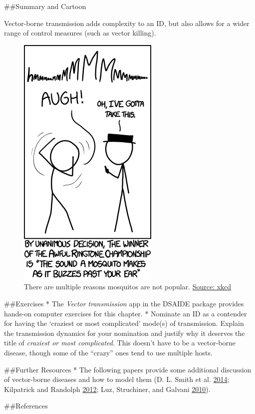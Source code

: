 \documentclass[]{book}
\theoremstyle{definition}
\theoremstyle{definition}
\theoremstyle{definition}
\theoremstyle{remark}
\begin{document}
\#\#Summary and Cartoon

Vector-borne transmission adds complexity to an ID, but also allows for
a wider range of control measures (such as vector killing).

\begin{figure}
\centering
\includegraphics{./images/xkcd-mosquito-ringtone.png}
\caption{There are multiple reasons mosquitos are not popular.
\href{https://xkcd.com/1241/}{Source: xkcd}}
\end{figure}

\#\#Exercises * The \emph{Vector transmission} app in the DSAIDE package
provides hands-on computer exercises for this chapter. * Nominate an ID
as a contender for having the `craziest or most complicated' mode(s) of
transmission. Explain the transmission dynamics for your nomination and
justify why it deserves the title of \emph{craziest or most
complicated}. This doesn't have to be a vector-borne disease, though
some of the ``crazy'' ones tend to use multiple hosts.

\#\#Further Resources * The following papers provide some additional
discussion of vector-borne diseases and how to model them (D. L. Smith
et al. \protect\hyperlink{ref-smith14}{2014}; Kilpatrick and Randolph
\protect\hyperlink{ref-kilpatrick12}{2012}; Luz, Struchiner, and Galvani
\protect\hyperlink{ref-luz10}{2010}).

\#\#References
\end{document}
